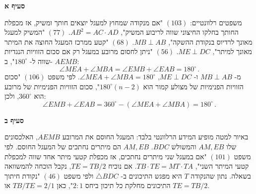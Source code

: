 \documentclass[12pt,a4paper]{article}
\newcommand*{\np}{\selectlanguage{english}\newpage\selectlanguage{hebrew}}
\begin{document}
\vspace{-2ex}

\textbf{סעיף א}

משפטים רלוונטיים: 
$(103)$
"אם מנקודה שמחוץ למעגל יוצאים חותך ומשיק, אז מכפלת החותך בחלקו החיצוני שווה לריבוע המשיק",
$AB^2=AC\cdot AD$.
$(77)$
"המשיק למעגל מאונך לרדיוס בנקודת ההשקה",
$MB \perp AB$. 
$(68)$
"קטע ממרכז המעגל החוצה את המיתר מאונך למיתר",
$ME\perp DC$.
$(56)$
"ניתן לחסום מרובע במעגל רק אם סכום הזוויות הנגדיות שווה ל-%
$180^\circ$",
ב-%
$AEMB$:
\[
\angle MEA+\angle MBA=\angle EMB+\angle EAB=180^\circ\,.
\]
מ-%
$MB \perp AB$
ו-%
$ME\perp DC$,
$\angle MEA + \angle MBA = 180^\circ$.
לפי משפט
$(106)$
"סכום הזוויות הפנימיות של מצולע קמור הוא
$180^\circ(n-2)$",
סכום הזוויות הפנימיות של מרובע הוא 
$360^\circ$,
ולכן:
\[
\angle EMB + \angle EAB = 360^\circ -(\angle MEA + \angle MBA) = 180^\circ\,.
\]
\vspace{-4ex}
\begin{center}
\end{center}

\np

\textbf{סעיף ב}

באיור למטה מופיע המידע הרלוונטי בלבד: המעגל החוסם את המרובע
$AEMB$,
האלכסונים שלו
$AM,EB$
והמשולש
$BDC$.
$AM,EB$
הם מיתרים נחתכים של המעגל החוסם. לפי משפט
$(101)$
"אם במעגל שני מיתרים נחתכים, אז מכפלת קטעי מיתר אחד שווה למכפלת קטעי המיתר השני",
$TB\cdot TE=MT\cdot TA$.
אם נוכיח
$TE=TB/2$,
נקבל הוכחה להמשוואה בשאלה.
נתון שהנקודה
$T$
היא מפגש התיכונים ב-%
$\triangle BDC$
ולפי משפט
$(46)$
"נקודת חיתוך התיכונים מחלקת כל תיכון ביחס
$2:1$",
כאן
$TB/TE=2/1$
או
$TE=TB/2$.
\end{document}
